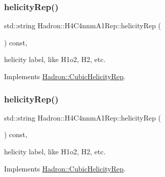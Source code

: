 \mbox{\label{structHadron_1_1H4C4nnmA1Rep_a9693ffed8dcfde2846c4cf56c107f88c}} 
\subsubsection{\texorpdfstring{helicityRep()}{helicityRep()}\hspace{0.1cm}{\footnotesize\ttfamily [1/2]}}
{\footnotesize\ttfamily std\+::string Hadron\+::\+H4\+C4nnm\+A1\+Rep\+::helicity\+Rep (\begin{DoxyParamCaption}{ }\end{DoxyParamCaption}) const\hspace{0.3cm}{\ttfamily [inline]}, {\ttfamily [virtual]}}

helicity label, like H1o2, H2, etc. 

Implements \mbox{\hyperlink{structHadron_1_1CubicHelicityRep_af1096946b7470edf0a55451cc662f231}{Hadron\+::\+Cubic\+Helicity\+Rep}}.

\mbox{\label{structHadron_1_1H4C4nnmA1Rep_a9693ffed8dcfde2846c4cf56c107f88c}} 
\subsubsection{\texorpdfstring{helicityRep()}{helicityRep()}\hspace{0.1cm}{\footnotesize\ttfamily [2/2]}}
{\footnotesize\ttfamily std\+::string Hadron\+::\+H4\+C4nnm\+A1\+Rep\+::helicity\+Rep (\begin{DoxyParamCaption}{ }\end{DoxyParamCaption}) const\hspace{0.3cm}{\ttfamily [inline]}, {\ttfamily [virtual]}}

helicity label, like H1o2, H2, etc. 

Implements \mbox{\hyperlink{structHadron_1_1CubicHelicityRep_af1096946b7470edf0a55451cc662f231}{Hadron\+::\+Cubic\+Helicity\+Rep}}.

\mbox{\label{structHadron_1_1H4C4nnmA1Rep_a1284b0ca578df221e5280750522ab4b2}} 
